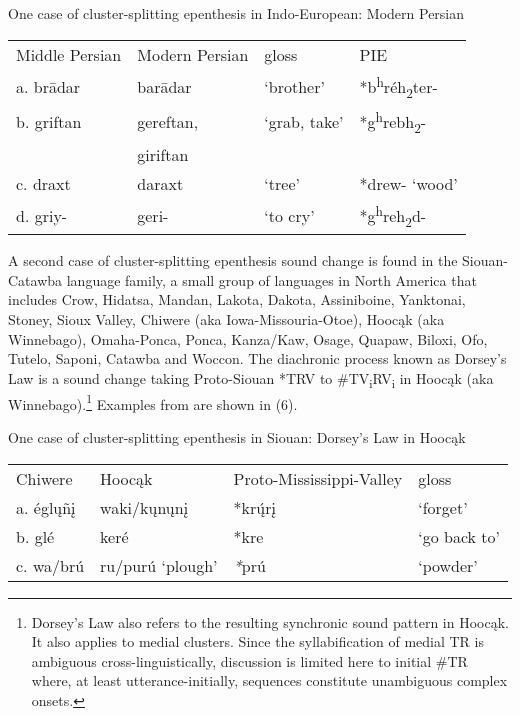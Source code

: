 \documentclass[output=paper,
modfonts
]{LSP/langsci}
\begin{document}
\ea One case of cluster-splitting epenthesis in Indo-European: Modern Persian 
\begin{table}
\begin{tabular}{llll}
Middle Persian & Modern Persian & gloss & PIE\\
a. brādar  & barādar & `brother' & *b\textsuperscript{h}réh\textsubscript{2}ter- \\

b. griftan & gereftan, & `grab, take' &  *g\textsuperscript{h}rebh\textsubscript{2}- \\
 & giriftan & & \\

c. draxt & daraxt  & `tree' &  *drew- `wood' \\

d. griy- & geri- & `to cry' & *g\textsuperscript{h}reh\textsubscript{2}d- \\
\end{tabular}
\end{table}
\z

A second case of cluster-splitting epenthesis sound change is found in
the Siouan-Catawba language family, a small group of languages in North
America that includes Crow, Hidatsa, Mandan, Lakota, Dakota,
Assiniboine, Yanktonai, Stoney, Sioux Valley, Chiwere (aka
Iowa-Missouria-Otoe), Hoocąk (aka Winnebago), Omaha-Ponca, Ponca,
Kanza/Kaw, Osage, Quapaw, Biloxi, Ofo, Tutelo, Saponi, Catawba and
Woccon. The diachronic process known as Dorsey's Law \citep{dorsey1885a} is a
sound change taking Proto-Siouan *TRV to
\#TV\textsubscript{i}RV\textsubscript{i} in Hoocąk (aka
Winnebago).\footnote{Dorsey's Law also refers to the resulting
  synchronic sound pattern in Hoocąk. It also applies to medial
  clusters. Since the syllabification of medial TR is ambiguous
  cross-linguistically, discussion is limited here to initial \#TR
  where, at least utterance-initially, sequences constitute unambiguous
  complex onsets.} Examples from \citet{rankin2015a} are shown in (6).

\begin{exe}
\ex One case of cluster-splitting epenthesis in Siouan: Dorsey's Law in
Hoocąk
\begin{table}
\begin{tabular}{llll}
Chiwere & Hoocąk & Proto-Mississippi-Valley &  gloss\\

a. églųñį & waki/kųnųnį & *krų́rį & `forget' \\

b. glé & keré & *kre & `go back to' \\

c. wa/brú & ru/purú `plough' & \emph{*}prú & `powder' \\
\end{tabular}
\end{table}
\end{exe}
\end{document}
